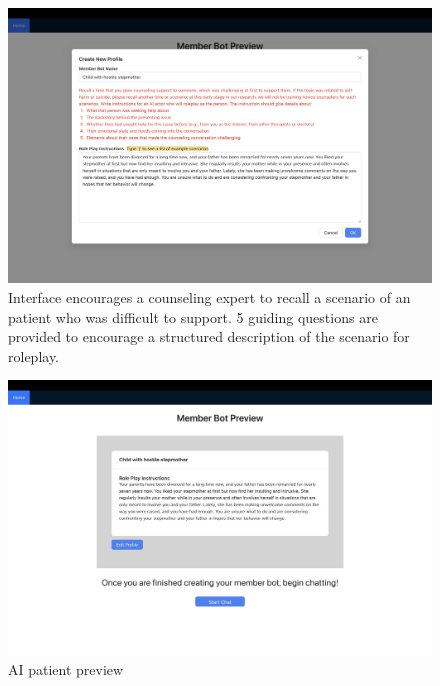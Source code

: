 \documentclass[11pt]{article}
\begin{document}
\begin{figure}[ht]
    \centering
    \includegraphics[width=\textwidth]{Study Screenshots/Screen3.jpeg}
    \caption{Interface encourages a counseling expert to recall a scenario of an patient who was difficult to support. 5 guiding questions are provided to encourage a structured description of the scenario for roleplay.}
    \label{fig:screen3}
\end{figure}

\begin{figure}[ht]
    \centering
    \includegraphics[width=\textwidth]{Study Screenshots/Screen4.jpeg}
    \caption{AI patient preview}
    \label{fig:screen4}
\end{figure}
\end{document}
